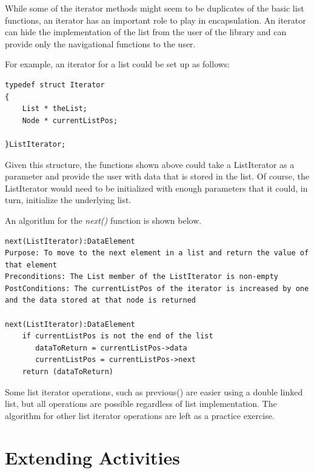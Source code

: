 While some of the iterator methods might seem to be duplicates of the basic list functions,  an iterator has an important role to play in encapsulation.     An iterator can hide the implementation of the list from the user of the library and can provide only the navigational functions to the user.

For example,  an iterator for a list could be set up as follows:

\begin{lstlisting}
typedef struct Iterator
{
    List * theList;
    Node * currentListPos;

}ListIterator;

\end{lstlisting}

Given this structure,  the functions shown above could take a ListIterator as a parameter and provide the user with data that is stored in the list.   Of course, the ListIterator would need to be initialized with enough parameters that it could, in turn, initialize the underlying list.

An algorithm for the \textit{next()} function is shown below.

\begin{lstlisting}
next(ListIterator):DataElement  
Purpose: To move to the next element in a list and return the value of that element
Preconditions: The List member of the ListIterator is non-empty
PostConditions: The currentListPos of the iterator is increased by one and the data stored at that node is returned

next(ListIterator):DataElement  
	if currentListPos is not the end of the list
	   dataToReturn = currentListPos->data
	   currentListPos = currentListPos->next
	return (dataToReturn)
\end{lstlisting}


Some list iterator operations, such as previous() are easier using a double linked list, but all operations are possible regardless of list implementation.   The algorithm for other list iterator operations are left as a practice exercise.

\section{Extending Activities}

